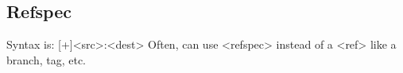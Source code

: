 \subsection*{Refspec}
Syntax is: [+]<src>:<dest>  Often, can use <refspec> instead of a <ref> like a branch, tag, etc.





















